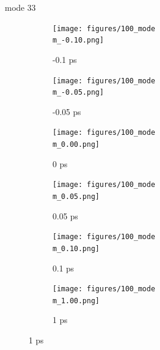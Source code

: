 \documentclass{beamer}
\newcommand\w{0.32}
\begin{document}
\renewcommand\m{33}
\begin{frame}{mode \m}
	\begin{figure}
		\centering
		\begin{subfigure}[b]{\w\textwidth}
			\centering
			\texttt{[image: figures/100\_mode\\m\_-0.10.png]}
			\caption{-0.1 ps}
		\end{subfigure}
		\begin{subfigure}[b]{\w\textwidth}
			\centering
			\texttt{[image: figures/100\_mode\\m\_-0.05.png]}
			\caption{-0.05 ps}
		\end{subfigure}
		\begin{subfigure}[b]{\w\textwidth}
			\centering
			\texttt{[image: figures/100\_mode\\m\_0.00.png]}
			\caption{0 ps}
		\end{subfigure}
		\begin{subfigure}[b]{\w\textwidth}
			\centering
			\texttt{[image: figures/100\_mode\\m\_0.05.png]}
			\caption{0.05 ps}
		\end{subfigure}
		\begin{subfigure}[b]{\w\textwidth}
			\centering
			\texttt{[image: figures/100\_mode\\m\_0.10.png]}
			\caption{0.1 ps}
		\end{subfigure}
		\begin{subfigure}[b]{\w\textwidth}
			\centering
			\texttt{[image: figures/100\_mode\\m\_1.00.png]}
			\caption{1 ps}
		\end{subfigure}
	\end{figure}
\end{frame}
\end{document}
